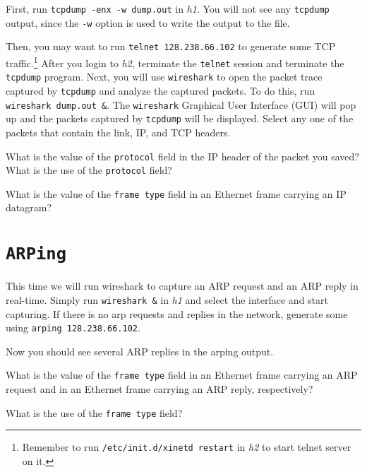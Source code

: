 \documentclass{../UTNetLab}
\begin{document}
    First, run \lstinline{tcpdump -enx -w dump.out} in \textit{h1}.
    You will not see any \lstinline{tcpdump} output, since the \lstinline{-w} option is used to write the output to the  file.

    Then, you may want to run \lstinline{telnet 128.238.66.102} to generate some TCP traffic.\footnote{Remember to run \lstinline{/etc/init.d/xinetd restart} in \textit{h2} to start telnet server on it.}
    After you login to \textit{h2}, terminate the \lstinline{telnet} session and terminate the \lstinline{tcpdump} program.
    Next, you will use \lstinline{wireshark} to open the packet trace captured by \lstinline{tcpdump} and analyze the captured packets.
    To do this, run \lstinline{wireshark dump.out &}.
    The \lstinline{wireshark} Graphical User Interface (GUI) will pop up and the packets captured by \lstinline{tcpdump} will be displayed.
    Select any one of the packets that contain the link, IP, and TCP headers.
    
    \begin{report}
    \item What is the value of the \texttt{protocol} field in the IP header of the packet you saved?
    What is the use of the \texttt{protocol} field?

    \item What is the value of the \texttt{frame type} field in an Ethernet frame carrying an IP datagram?
    \end{report}

\section{\texttt{ARPing}}
    This time we will run wireshark to capture an ARP request and an ARP reply in real-time. Simply run \lstinline{wireshark &} in \textit{h1} and select the interface and start capturing.
    If there is no arp requests and replies in the network, generate some using \lstinline{arping 128.238.66.102}.

    Now you should see several ARP replies in the arping output.
    
    \begin{report}
    \item What is the value of the \texttt{frame type} field in an Ethernet frame carrying an ARP request and in an Ethernet frame carrying an ARP reply, respectively?

    \item What is the use of the \texttt{frame type} field?
    \end{report}
\end{document}
